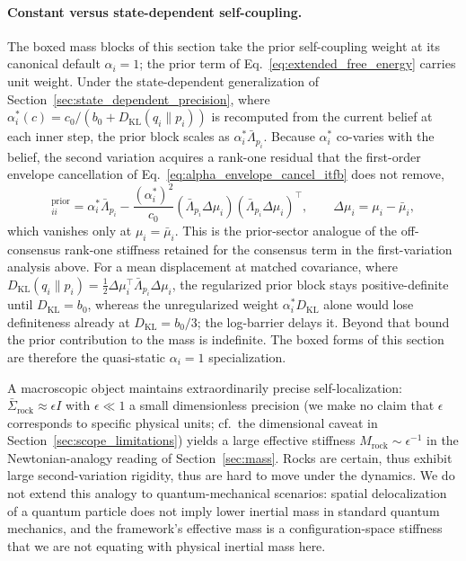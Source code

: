 \documentclass[11pt]{article}
\begin{document}
\paragraph{Constant versus state-dependent self-coupling.} The boxed mass blocks of this section take the prior self-coupling weight at its canonical default $\alpha_i = 1$; the prior term of Eq.~\eqref{eq:extended_free_energy} carries unit weight. Under the state-dependent generalization of Section~\ref{sec:state_dependent_precision}, where $\alpha_i^*(c) = c_0/(b_0 + D_{\mathrm{KL}}(q_i \| p_i))$ is recomputed from the current belief at each inner step, the prior block scales as $\alpha_i^* \bar{\Lambda}_{p_i}$. Because $\alpha_i^*$ co-varies with the belief, the second variation acquires a rank-one residual that the first-order envelope cancellation of Eq.~\eqref{eq:alpha_envelope_cancel_itfb} does not remove,
\begin{equation}
[M_{\mu\mu}]_{ii}^{\text{prior}} = \alpha_i^* \bar{\Lambda}_{p_i} - \frac{(\alpha_i^*)^2}{c_0}\left(\bar{\Lambda}_{p_i}\Delta\mu_i\right)\left(\bar{\Lambda}_{p_i}\Delta\mu_i\right)^\top, \qquad \Delta\mu_i = \mu_i - \bar{\mu}_i,
\end{equation}
which vanishes only at $\mu_i = \bar{\mu}_i$. This is the prior-sector analogue of the off-consensus rank-one stiffness retained for the consensus term in the first-variation analysis above. For a mean displacement at matched covariance, where $D_{\mathrm{KL}}(q_i \| p_i) = \tfrac{1}{2}\Delta\mu_i^\top \bar{\Lambda}_{p_i}\Delta\mu_i$, the regularized prior block stays positive-definite until $D_{\mathrm{KL}} = b_0$, whereas the unregularized weight $\alpha_i^* D_{\mathrm{KL}}$ alone would lose definiteness already at $D_{\mathrm{KL}} = b_0/3$; the log-barrier delays it. Beyond that bound the prior contribution to the mass is indefinite. The boxed forms of this section are therefore the quasi-static $\alpha_i = 1$ specialization.

A macroscopic object maintains extraordinarily precise self-localization: $\bar{\Sigma}_{\mathrm{rock}} \approx \epsilon I$ with $\epsilon \ll 1$ a small dimensionless precision (we make no claim that $\epsilon$ corresponds to specific physical units; cf.\ the dimensional caveat in Section~\ref{sec:scope_limitations}) yields a large effective stiffness $M_{\mathrm{rock}} \sim \epsilon^{-1}$ in the Newtonian-analogy reading of Section~\ref{sec:mass}. Rocks are certain, thus exhibit large second-variation rigidity, thus are hard to move under the dynamics. We do not extend this analogy to quantum-mechanical scenarios: spatial delocalization of a quantum particle does not imply lower inertial mass in standard quantum mechanics, and the framework's effective mass is a configuration-space stiffness that we are not equating with physical inertial mass here.
\end{document}
